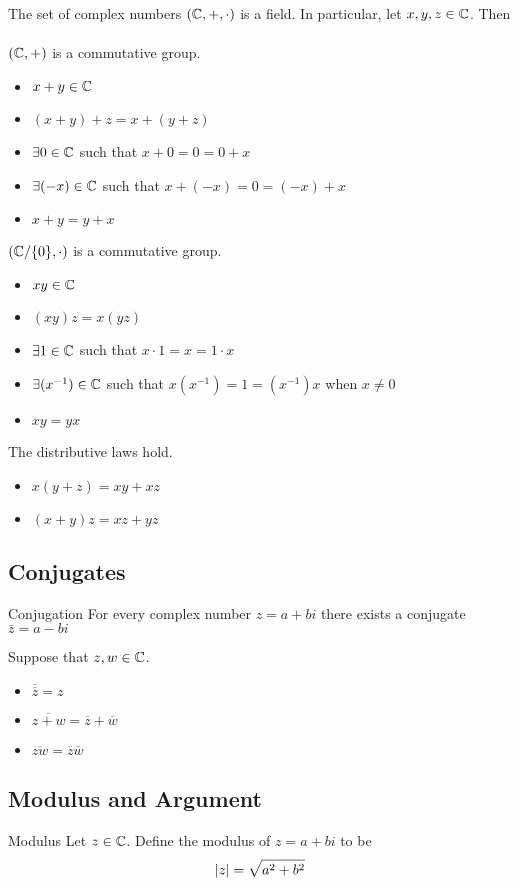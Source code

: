 \documentclass[a4paper]{article}
\begin{document}
\begin{prp}{}{} The set of complex numbers $(\mathbb{C},+,\cdot)$ is a field. In particular, let $x,y,z\in\mathbb{C}$. Then\\~\\
$(\mathbb{C},+)$ is a commutative group. 
\begin{itemize}
\item $x+y\in\mathbb{C}$
\item $(x+y)+z=x+(y+z)$
\item $\exists 0\in\mathbb{C}$ such that $x+0=0=0+x$
\item $\exists(-x)\in\mathbb{C}$ such that $x+(-x)=0=(-x)+x$
\item $x+y=y+x$
\end{itemize}
$(\mathbb{C}/\{0\},\cdot)$ is a commutative group. 
\begin{itemize}
\item $xy\in\mathbb{C}$
\item $(xy)z=x(yz)$
\item $\exists 1\in\mathbb{C}$ such that $x\cdot1=x=1\cdot x$
\item $\exists (x^{-1})\in\mathbb{C}$ such that $x(x^{-1})=1=(x^{-1})x$ when $x\neq0$
\item $xy=yx$
\end{itemize}
The distributive laws hold. 
\begin{itemize}
\item $x(y+z)=xy+xz$
\item $(x+y)z=xz+yz$
\end{itemize}
\end{prp}

\subsection{Conjugates}
\begin{defn}{Conjugation}{} For every complex number $z=a+bi$ there exists a conjugate $\bar{z}=a-bi$
\end{defn}

\begin{prp}{}{} Suppose that $z,w\in\mathbb{C}$. 
\begin{itemize}
\item $\overline{\overline{z}}=z$
\item $\overline{z+w}=\overline{z}+\overline{w}$
\item $\overline{zw}=\overline{z}\overline{w}$
\end{itemize}
\end{prp}


\subsection{Modulus and Argument}
\begin{defn}{Modulus}{} Let $z\in\mathbb{C}$. Define the modulus of $z=a+bi$ to be $$\abs{z}=\sqrt{a^2+b^2}$$
\end{defn}
\end{document}

